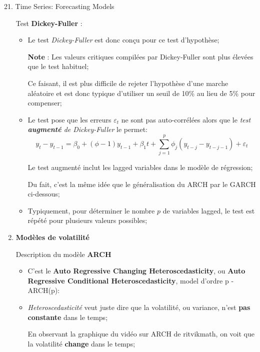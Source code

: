 \documentclass[12pt, titlepage, french]{report}
\begin{document}
\begin{CHPT_SUMM}[label = {timeseries21}]{21. Time Series: Forecasting Models}
\begin{enumerate}
\begin{itemize}
\begin{align*}
			\end{align*}
		\setlength{\mathindent}{1cm}
		\item	Cependant, puisque sous l'hypothèse nulle la série est une marche aléatoire, $t_{ddl}$ \textit{ne suit \textbf{pas} la distribution $t$ habituelle} ($t_{ddl} \not\sim t$) mais plutôt une distribution spéciale;
		\end{itemize}
	\item[]	Test \textbf{Dickey-Fuller} :
		\begin{itemize}
		\item	Le test \textit{Dickey-Fuller} est donc conçu pour ce test d'hypothèse;
		\item[\textbf{Note}]: Les valeurs critiques compilées par Dickey-Fuller sont plus élevées que le test habituel;
		\item[]	Ce faisant, il est plus difficile de rejeter l'hypothèse d'une marche aléatoire et est donc typique d'utiliser un seuil de 10\% au lieu de 5\% pour compenser;		
		\item	Le test pose que les erreurs $\varepsilon_{t}$ ne sont pas auto-corrélées alors que le \textit{test \textbf{augmenté} de Dickey-Fuller} le permet:
			\begin{equation*}
			y_{t} - y_{t - 1}	
			=	\beta_{0} + (\phi - 1) y_{t - 1} + \beta_{1} t + \sum_{j = 1}^{p} \phi_{j} (y_{t - j} - y_{t - j - 1}) + \varepsilon_{t}
			\end{equation*}
		\item[]	Le test augmenté inclut les lagged variables dans le modèle de régression;
		\item[]	Du fait, c'est la même idée que le généralisation du ARCH par le GARCH ci-dessous;
		\item	Typiquement, pour déterminer le nombre $p$ de variables lagged, le test est répété pour plusieurs valeurs possibles;
		\end{itemize}
	\item	\textbf{Modèles de volatilité}
	\item[]	Description du modèle \textbf{ARCH}
		\begin{itemize}
		\item	C'est le \textbf{Auto Regressive Changing Heteroscedasticity}, ou \textbf{Auto Regressive Conditional Heteroscedasticity}, model d'ordre p - ARCH(p):
		\item	\textit{Heteroscedasticité} veut juste dire que la volatilité, ou variance, n'est \textbf{pas constante} dans le temps;
		\item[]	En observant la graphique du vidéo sur ARCH de ritvikmath, on voit que la volatilité \textbf{change} dans le temps;

\end{itemize}
\end{enumerate}
\end{CHPT_SUMM}
\end{document}
